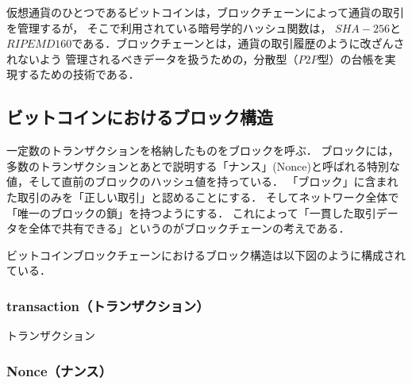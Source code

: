 \documentclass[a4paper,12pt]{jsarticle}
\begin{document}
仮想通貨のひとつであるビットコインは，ブロックチェーンによって通貨の取引を管理するが，
そこで利用されている暗号学的ハッシュ関数は，
$SHA-256$と$RIPEMD160$である．ブロックチェーンとは，通貨の取引履歴のように改ざんされないよう
管理されるべきデータを扱うための，分散型（$P2P$型）の台帳を実現するための技術である．





      \subsection*{ビットコインにおけるブロック構造}
一定数のトランザクションを格納したものをブロックを呼ぶ．
ブロックには，多数のトランザクションとあとで説明する「ナンス」(Nonce)と呼ばれる特別な値，そして直前のブロックのハッシュ値を持っている．
「ブロック」に含まれた取引のみを「正しい取引」と認めることにする．
そしてネットワーク全体で「唯一のブロックの鎖」を持つようにする．
これによって「一貫した取引データを全体で共有できる」というのがブロックチェーンの考えである．%

ビットコインブロックチェーンにおけるブロック構造は以下図のように構成されている．


            \subsubsection{transaction（トランザクション）}
トランザクション
            \subsubsection{Nonce（ナンス）}
\end{document}
